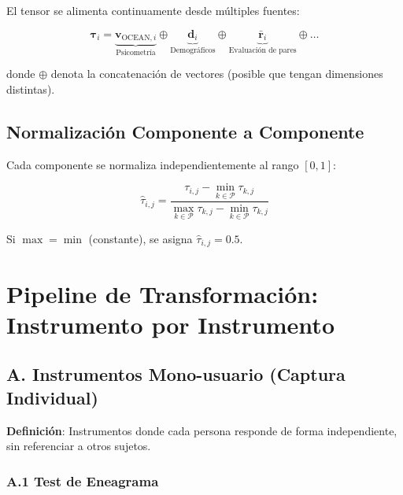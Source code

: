 \documentclass[12pt,a4paper]{article}
\begin{document}
El tensor se alimenta continuamente desde múltiples fuentes:

\[
\boldsymbol{\tau}_i = \underbrace{\mathbf{v}_{\text{OCEAN},i}}_{\text{Psicometría}} \oplus \underbrace{\mathbf{d}_i}_{\text{Demográficos}} \oplus \underbrace{\bar{\mathbf{r}}_i}_{\text{Evaluación de pares}} \oplus \ldots
\]

donde $\oplus$ denota la concatenación de vectores (posible que tengan dimensiones distintas).

\subsection{Normalización Componente a Componente}

Cada componente se normaliza independientemente al rango $[0, 1]$:

\[
\hat{\tau}_{i,j} = \frac{\tau_{i,j} - \min_{k \in \mathcal{P}} \tau_{k,j}}{\max_{k \in \mathcal{P}} \tau_{k,j} - \min_{k \in \mathcal{P}} \tau_{k,j}}
\]

Si $\max = \min$ (constante), se asigna $\hat{\tau}_{i,j} = 0.5$.

\section{Pipeline de Transformación: Instrumento por Instrumento}
\label{sec:pipeline}

\subsection{A. Instrumentos Mono-usuario (Captura Individual)}
\label{subsec:mono}

\textbf{Definición}: Instrumentos donde cada persona responde de forma independiente, sin referenciar a otros sujetos.

\subsubsection{A.1 Test de Eneagrama}
\end{document}

